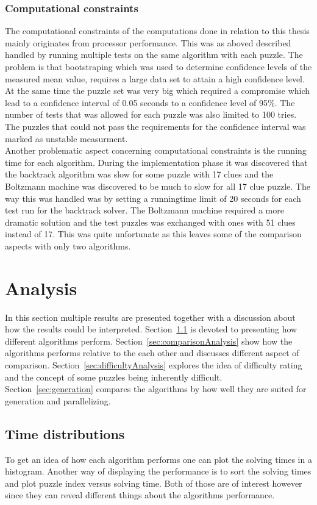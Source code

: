 \documentclass[a4paper,11pt]{kth-mag}
\begin{document}
\FloatBarrier
\subsection{Computational constraints}
The computational constraints of the computations done in relation to this thesis mainly originates from processor performance.
This was as aboved described handled by running multiple tests on the same algorithm with each puzzle.
The problem is that bootstraping which was used to determine confidence levels of the measured mean value, requires a large data set to attain a high confidence level. 
At the same time the puzzle set was very big which required a compromise which lead to a confidence interval of 0.05 seconds to a confidence level of 95\%. The number of tests that was allowed for each puzzle was also limited to 100 tries.
The puzzles that could not pass the requirements for the confidence interval was marked as unstable measurment.
\\
Another problematic aspect concerning computational constraints is the running time for each algorithm.
During the implementation phase it was discovered that the backtrack algorithm was slow for some puzzle with 17 clues and the Boltzmann machine was discovered to be much to slow for all 17 clue puzzle.
The way this was handled was by setting a runningtime limit of 20 seconds for each test run for the backtrack solver.
The Boltzmann machine required a more dramatic solution and the test puzzles was exchanged with ones with 51 clues instead of 17. 
This was quite unfortunate as this leaves some of the comparison aspects with only two algorithms.

\chapter{Analysis}
In this section multiple results are presented together with a discussion about how the results could be interpreted. 
Section~\ref{sec:timeDistributions} is devoted to presenting how different algorithms perform. 
Section~\ref{sec:comparisonAnalysis} show how the algorithms performs relative to the each other and discusses different aspect of comparison.
Section~\ref{sec:difficultyAnalysis} explores the idea of difficulty rating and the concept of some puzzles being inherently difficult.
Section~\ref{sec:generation} compares the algorithms by how well they are suited for generation and parallelizing.

\FloatBarrier
\section{Time distributions}
\label{sec:timeDistributions}
To get an idea of how each algorithm performs one can plot the solving times in a histogram. 
Another way of displaying the performance is to sort the solving times and plot puzzle index versus solving time. 
Both of those are of interest however since they can reveal different things about the algorithms performance. 
 
\end{document}

